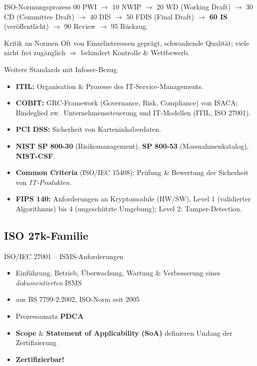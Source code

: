 \documentclass[a4paper, fontsize=7pt]{scrartcl}
\begin{document}
\begin{subbox}{ISO-Normungsprozess}
00 PWI $\to$ 10 NWIP $\to$ 20 WD (Working Draft) $\to$ 30 CD (Committee Draft)
$\to$ 40 DIS $\to$ 50 FDIS (Final Draft) $\to$ \textbf{60 IS} (veröffentlicht)
$\to$ 90 Review $\to$ 95 Rückzug.
\end{subbox}

\begin{subbox}{Kritik an Normen}
Oft von Einzelinteressen geprägt, schwankende Qualität; viele nicht frei
zugänglich $\Rightarrow$ behindert Kontrolle \& Wettbewerb.
\end{subbox}

\begin{mainbox}{Weitere Standards mit Infosec-Bezug}
\begin{itemize}
    \item \textbf{ITIL:} Organisation \& Prozesse des IT-Service-Managements.
    \item \textbf{COBIT:} GRC-Framework (Governance, Risk, Compliance) von ISACA;
          Bindeglied zw.\ Unternehmenssteuerung und IT-Modellen (ITIL, ISO 27001).
    \item \textbf{PCI DSS:} Sicherheit von Karteninhaberdaten.
    \item \textbf{NIST SP 800-30} (Risikomanagement), \textbf{SP 800-53}
          (Massnahmenkatalog), \textbf{NIST-CSF}.
    \item \textbf{Common Criteria} (ISO/IEC 15408): Prüfung \& Bewertung der
          Sicherheit von \emph{IT-Produkten}.
    \item \textbf{FIPS 140:} Anforderungen an Kryptomodule (HW/SW), Level 1
          (validierter Algorithmus) bis 4 (ungeschützte Umgebung); Level 2:
          Tamper-Detection.
\end{itemize}
\end{mainbox}

\subsection{ISO 27k-Familie}

\begin{mainbox}{ISO/IEC 27001 -- ISMS-Anforderungen}
\begin{itemize}
    \item Einführung, Betrieb, Überwachung, Wartung \& Verbesserung eines
          \emph{dokumentierten} ISMS
    \item aus BS 7799-2:2002, ISO-Norm seit 2005
    \item Prozessansatz \textbf{PDCA}
    \item \textbf{Scope} \& \textbf{Statement of Applicability (SoA)} definieren
          Umfang der Zertifizierung
    \item \textbf{Zertifizierbar!}
\end{itemize}
\end{mainbox}
\end{document}
